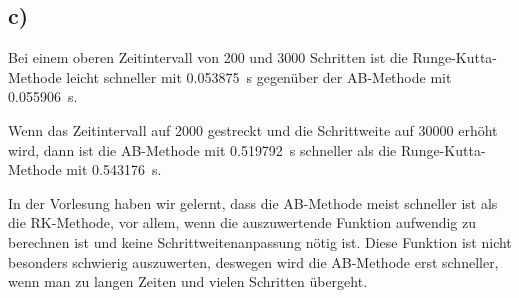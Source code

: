 \subsection*{c)}
Bei einem oberen Zeitintervall von 200 und 3000 Schritten ist die Runge-Kutta-Methode
leicht schneller mit \SI{0.053875}{\s} gegenüber der AB-Methode mit \SI{0.055906}{\s}.

Wenn das Zeitintervall auf 2000 gestreckt und die Schrittweite auf 30000 erhöht wird,
dann ist die AB-Methode mit \SI{0.519792}{\s} schneller als die Runge-Kutta-Methode
mit \SI{0.543176}{\s}.

In der Vorlesung haben wir gelernt, dass die AB-Methode meist schneller ist als
die RK-Methode, vor allem, wenn die auszuwertende Funktion aufwendig zu berechnen
ist und keine Schrittweitenanpassung nötig ist. Diese Funktion ist nicht besonders
schwierig auszuwerten, deswegen wird die AB-Methode erst schneller, wenn man zu
langen Zeiten und vielen Schritten übergeht.
